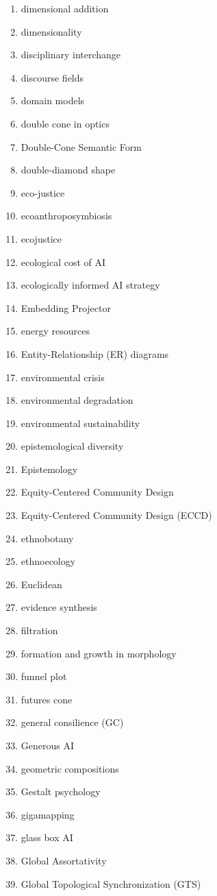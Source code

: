 \begin{multicols}{4}
\begin{enumerate}[label=\arabic*.]
\item dimensional addition
\item dimensionality
\item disciplinary interchange
\item discourse fields
\item domain models
\item double cone in optics
\item Double-Cone Semantic Form
\item double-diamond shape
\item eco-justice
\item ecoanthroposymbiosis
\item ecojustice
\item ecological cost of AI
\item ecologically informed AI strategy
\item Embedding Projector
\item energy resources
\item Entity-Relationship (ER) diagrams
\item environmental crisis
\item environmental degradation
\item environmental sustainability
\item epistemological diversity
\item Epistemology
\item Equity-Centered Community Design
\item Equity-Centered Community Design (ECCD)
\item ethnobotany
\item ethnoecology
\item Euclidean
\item evidence synthesis
\item filtration
\item formation and growth in morphology
\item funnel plot
\item futures cone
\item general consilience (GC)
\item Generous AI
\item geometric compositions
\item Gestalt psychology
\item gigamapping
\item glass box AI
\item Global Assortativity
\item Global Topological Synchronization (GTS)

\end{enumerate}
\end{multicols}
